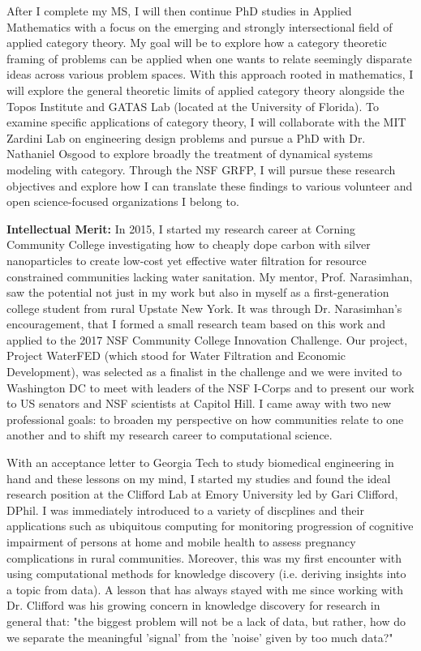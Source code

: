 \documentclass[11pt]{extarticle}
\begin{document}
After I complete my MS, I will then continue PhD studies in Applied Mathematics with a focus on the emerging and strongly intersectional field of applied category theory.
My goal will be to explore how a category theoretic framing of problems can be applied when one wants to relate seemingly disparate ideas across various problem spaces.
With this approach rooted in mathematics, I will explore the general theoretic limits of applied category theory alongside the Topos Institute and GATAS Lab (located at the University of Florida).
To examine specific applications of category theory, I will collaborate with the MIT Zardini Lab on engineering design problems and pursue a PhD with Dr. Nathaniel Osgood to explore broadly the treatment of dynamical systems modeling with category.
Through the NSF GRFP, I will pursue these research objectives and explore how I can translate these findings to various volunteer and open science-focused organizations I belong to.

\textbf{Intellectual Merit:} In 2015, I started my research career at Corning Community College investigating how to cheaply dope carbon with silver nanoparticles to create low-cost yet effective water filtration for resource constrained communities lacking water sanitation.
My mentor, Prof. Narasimhan, saw the potential not just in my work but also in myself as a first-generation college student from rural Upstate New York.
It was through Dr. Narasimhan's encouragement, that I formed a small research team based on this work and applied to the 2017 NSF Community College Innovation Challenge.
Our project, Project WaterFED (which stood for Water Filtration and Economic Development), was selected as a finalist in the challenge and we were invited to Washington DC to meet with leaders of the NSF I-Corps and to present our work to US senators and NSF scientists at Capitol Hill. 
I came away with two new professional goals: to broaden my perspective on how communities relate to one another and to shift my research career to computational science.

With an acceptance letter to Georgia Tech to study biomedical engineering in hand and these lessons on my mind, I started my studies and found the ideal research position at the Clifford Lab at Emory University led by Gari Clifford, DPhil. 
I was immediately introduced to a variety of discplines and their applications such as ubiquitous computing for monitoring progression of cognitive impairment of persons at home and mobile health to assess pregnancy complications in rural communities.
Moreover, this was my first encounter with using computational methods for knowledge discovery (i.e. deriving insights into a topic from data).
A lesson that has always stayed with me since working with Dr. Clifford was his growing concern in knowledge discovery for research in general that: "the biggest problem will not be a lack of data, but rather, how do we separate the meaningful 'signal' from the 'noise' given by too much data?"
\end{document}
